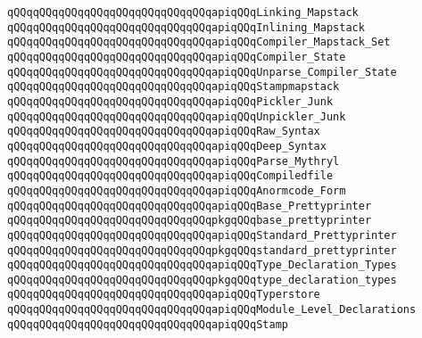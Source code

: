 \verb|qQQqqQQqqQQqqQQqqQQqqQQqqQQqqQQqapiqQQqLinking_Mapstack|\newline
\verb|qQQqqQQqqQQqqQQqqQQqqQQqqQQqqQQqapiqQQqInlining_Mapstack|\newline
\verb|qQQqqQQqqQQqqQQqqQQqqQQqqQQqqQQqapiqQQqCompiler_Mapstack_Set|\newline
\verb|qQQqqQQqqQQqqQQqqQQqqQQqqQQqqQQqapiqQQqCompiler_State|\newline
\verb|qQQqqQQqqQQqqQQqqQQqqQQqqQQqqQQqapiqQQqUnparse_Compiler_State|\newline
\verb|qQQqqQQqqQQqqQQqqQQqqQQqqQQqqQQqapiqQQqStampmapstack|\newline
\verb|qQQqqQQqqQQqqQQqqQQqqQQqqQQqqQQqapiqQQqPickler_Junk|\newline
\verb|qQQqqQQqqQQqqQQqqQQqqQQqqQQqqQQqapiqQQqUnpickler_Junk|\newline
\verb|qQQqqQQqqQQqqQQqqQQqqQQqqQQqqQQqapiqQQqRaw_Syntax|\newline
\verb|qQQqqQQqqQQqqQQqqQQqqQQqqQQqqQQqapiqQQqDeep_Syntax|\newline
\verb|qQQqqQQqqQQqqQQqqQQqqQQqqQQqqQQqapiqQQqParse_Mythryl|\newline
\verb|qQQqqQQqqQQqqQQqqQQqqQQqqQQqqQQqapiqQQqCompiledfile|\newline
\verb|qQQqqQQqqQQqqQQqqQQqqQQqqQQqqQQqapiqQQqAnormcode_Form|\newline
\newline
\verb|qQQqqQQqqQQqqQQqqQQqqQQqqQQqqQQqapiqQQqBase_Prettyprinter|\newline
\verb|qQQqqQQqqQQqqQQqqQQqqQQqqQQqqQQqpkgqQQqbase_prettyprinter|\newline
\newline
\verb|qQQqqQQqqQQqqQQqqQQqqQQqqQQqqQQqapiqQQqStandard_Prettyprinter|\newline
\verb|qQQqqQQqqQQqqQQqqQQqqQQqqQQqqQQqpkgqQQqstandard_prettyprinter|\newline
\newline
\verb|qQQqqQQqqQQqqQQqqQQqqQQqqQQqqQQqapiqQQqType_Declaration_Types|\newline
\verb|qQQqqQQqqQQqqQQqqQQqqQQqqQQqqQQqpkgqQQqtype_declaration_types|\newline
\newline
\verb|qQQqqQQqqQQqqQQqqQQqqQQqqQQqqQQqapiqQQqTyperstore|\newline
\verb|qQQqqQQqqQQqqQQqqQQqqQQqqQQqqQQqapiqQQqModule_Level_Declarations|\newline
\verb|qQQqqQQqqQQqqQQqqQQqqQQqqQQqqQQqapiqQQqStamp|\newline
